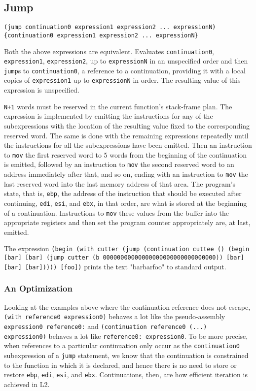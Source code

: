 \documentclass[twocolumn,landscape]{article}
\begin{document}
    \subsection{Jump}\label{sec:jump}
      \begin{lstlisting}
(jump continuation0 expression1 expression2 ... expressionN)
{continuation0 expression1 expression2 ... expressionN}
      \end{lstlisting}
      Both the above expressions are equivalent. Evaluates \lstinline{continuation0}, \lstinline{expression1}, \lstinline{expression2}, up to \lstinline{expressionN} in an unspecified order and then \lstinline{jump}s to \lstinline{continuation0}, a reference to a continuation, providing it with a local copies of \lstinline{expression1} up to \lstinline{expressionN} in order. The resulting value of this expression is unspecified.

      \lstinline{N+1} words must be reserved in the current function's stack-frame plan. The expression is implemented by emitting the instructions for any of the subexpressions with the location of the resulting value fixed to the corresponding reserved word. The same is done with the remaining expressions repeatedly until the instructions for all the subexpressions have been emitted. Then an instruction to \lstinline{mov} the first reserved word to 5 words from the beginning of the continuation is emitted, followed by an instruction to \lstinline{mov} the second reserved word to an address immediately after that, and so on, ending with an instruction to \lstinline{mov} the last reserved word into the last memory address of that area. The program's state, that is, \lstinline{ebp}, the address of the instruction that should be executed after continuing, \lstinline{edi}, \lstinline{esi}, and \lstinline{ebx}, in that order, are what is stored at the beginning of a continuation. Instructions to \lstinline{mov} these values from the buffer into the appropriate registers and then set the program counter appropriately are, at last, emitted.

      The expression \lstinline{(begin (with cutter (jump (continuation cuttee () (begin [bar] [bar] (jump cutter (b 00000000000000000000000000000000)) [bar] [bar] [bar])))) [foo])} prints the text "barbarfoo" to standard output.

      \subsubsection{An Optimization}\label{sec:an-optimization}
        Looking at the examples above where the continuation reference does not escape, \lstinline{(with reference0 expression0)} behaves a lot like the pseudo-assembly \lstinline{expression0 reference0:} and \lstinline{(continuation reference0 (...) expression0)} behaves a lot like \lstinline{reference0: expression0}. To be more precise, when references to a particular continuation only occur as the \lstinline{continuation0} subexpression of a \lstinline{jump} statement, we know that the continuation is constrained to the function in which it is declared, and hence there is no need to store or restore \lstinline{ebp}, \lstinline{edi}, \lstinline{esi}, and \lstinline{ebx}. Continuations, then, are how efficient iteration is achieved in L2.
\end{document}
